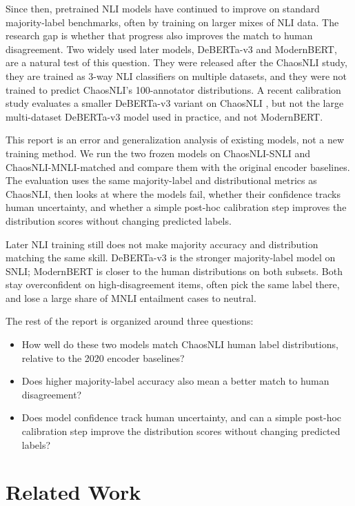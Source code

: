 \documentclass[11pt,a4paper]{article}
\begin{document}
Since then, pretrained NLI models have continued to improve on standard majority-label benchmarks, often by training on larger mixes of NLI data. The research gap is whether that progress also improves the match to human disagreement. Two widely used later models, DeBERTa-v3 and ModernBERT, are a natural test of this question. They were released after the ChaosNLI study, they are trained as 3-way NLI classifiers on multiple datasets, and they were not trained to predict ChaosNLI's 100-annotator distributions. A recent calibration study evaluates a smaller DeBERTa-v3 variant on ChaosNLI \citep{tao2026confidence}, but not the large multi-dataset DeBERTa-v3 model used in practice, and not ModernBERT.

This report is an error and generalization analysis of existing models, not a new training method. We run the two frozen models on ChaosNLI-SNLI and ChaosNLI-MNLI-matched and compare them with the original encoder baselines. The evaluation uses the same majority-label and distributional metrics as ChaosNLI, then looks at where the models fail, whether their confidence tracks human uncertainty, and whether a simple post-hoc calibration step improves the distribution scores without changing predicted labels.

Later NLI training still does not make majority accuracy and distribution matching the same skill. DeBERTa-v3 is the stronger majority-label model on SNLI; ModernBERT is closer to the human distributions on both subsets. Both stay overconfident on high-disagreement items, often pick the same label there, and lose a large share of MNLI entailment cases to neutral.

The rest of the report is organized around three questions:
\begin{itemize}[itemsep=0.4em, topsep=0.4em]
    \item How well do these two models match ChaosNLI human label distributions, relative to the 2020 encoder baselines?
    \item Does higher majority-label accuracy also mean a better match to human disagreement?
    \item Does model confidence track human uncertainty, and can a simple post-hoc calibration step improve the distribution scores without changing predicted labels?
\end{itemize}

\section{Related Work}
\end{document}
